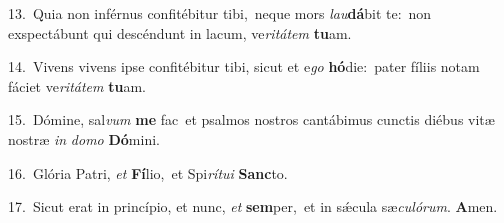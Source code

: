 {\numbfont\textcolor{\numbcolor}{13.}}~Quia non inférnus confitébitur tibi,~\dagger neque mors \textit{lau}\-\textbf{dá}bit te:~\star non exspectábunt qui descéndunt in lacum, ve\-\textit{ri}\-\textit{tá}\textit{tem} \textbf{tu}\-am.\par
{\numbfont\textcolor{\numbcolor}{14.}}~Vivens vivens ipse confitébitur tibi, sicut et e\textit{go} \textbf{hó}\-die:~\star pater fíliis notam fáciet ve\-\textit{ri}\-\textit{tá}\textit{tem} \textbf{tu}\-am.\par
{\numbfont\textcolor{\numbcolor}{15.}}~Dómine, sal\textit{vum} \textbf{me} fac~\star et psalmos nostros cantábimus cunctis diébus vitæ nostræ \textit{in} \textit{do}\-\textit{mo} \textbf{Dó}\-mini.\par
{\numbfont\textcolor{\numbcolor}{16.}}~Glória Patri, \textit{et} \textbf{Fí}\-lio,~\star et Spi\-\textit{rí}\-\textit{tu}\textit{i} \textbf{Sanc}\-to.\par
{\numbfont\textcolor{\numbcolor}{17.}}~Sicut erat in princípio, et nunc, \textit{et} \textbf{sem}\-per,~\star et in sǽcula sæ\-\textit{cu}\-\textit{ló}\textit{rum}. \textbf{A}\-men.\par
